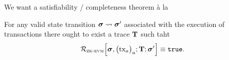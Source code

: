 We want a satisfiability / completeness theorem à la
\begin{thm}[Completeness]
	For any valid state transition $\bm{\sigma} \rightsquigarrow \bm{\sigma}'$ associated with the execution of transactions there ought to exist a trace $\textbf{T}$ such taht 
	\[
		\mathcal{R}_{\textsc{zk-evm}}
		\Big[ \bm{\sigma}, \big(\text{tx}_a\big)_{a};
		\textbf{T};
		\bm{\sigma}' \Big]
		\equiv \mathtt{true}.
	\]
\end{thm}
